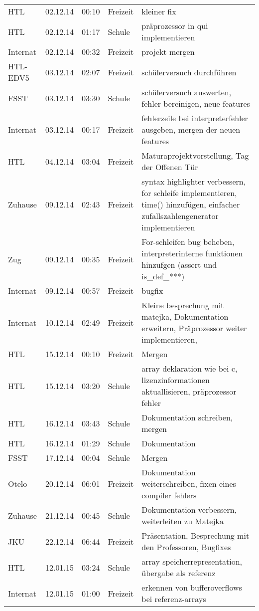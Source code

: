\begin{small}
\begin{longtable}{ p{} p{} p{} p{} p{}}
HTL	& 02.12.14	& 00:10	& Freizeit	& kleiner fix \\
HTL	& 02.12.14	& 01:17	& Schule	& pr\"aprozessor in qui implementieren \\
Internat	& 02.12.14	& 00:32	& Freizeit	& projekt mergen \\
HTL-EDV5	& 03.12.14	& 02:07	& Freizeit	& sch\"ulerversuch durchf\"uhren \\
FSST	& 03.12.14	& 03:30	& Schule	& sch\"ulerversuch auswerten, fehler bereinigen, neue features \\
Internat	& 03.12.14	& 00:17	& Freizeit	& fehlerzeile bei interpreterfehler ausgeben, mergen der neuen features \\
HTL	& 04.12.14	& 03:04	& Freizeit	& Maturaprojektvorstellung, Tag der Offenen T\"ur \\
Zuhause	& 09.12.14	& 02:43	& Freizeit	& syntax highlighter verbessern, for schleife implementieren, time() hinzuf\"ugen, einfacher zufallszahlengenerator implementieren \\
Zug	& 09.12.14	& 00:35	& Freizeit	& For-schleifen bug beheben, interpreterinterne funktionen hinzufgen (assert und is\_def\_***) \\
Internat	& 09.12.14	& 00:57	& Freizeit	& bugfix \\
Internat	& 10.12.14	& 02:49	& Freizeit	& Kleine besprechung mit matejka, Dokumentation erweitern, Pr\"aprozessor weiter implementieren,  \\
HTL	& 15.12.14	& 00:10	& Freizeit	& Mergen \\
HTL	& 15.12.14	& 03:20	& Schule	& array deklaration wie bei c, lizenzinformationen aktuallisieren, pr\"aprozessor fehler \\
HTL	& 16.12.14	& 03:43	& Schule	& Dokumentation schreiben, mergen \\
HTL	& 16.12.14	& 01:29	& Schule	& Dokumentation \\
FSST	& 17.12.14	& 00:04	& Schule	& Mergen \\
Otelo	& 20.12.14	& 06:01	& Freizeit	& Dokumentation weiterschreiben, fixen eines compiler fehlers \\
Zuhause	& 21.12.14	& 00:45	& Schule	& Dokumentation verbessern, weiterleiten zu Matejka \\
JKU	& 22.12.14	& 06:44	& Freizeit	& Pr\"asentation, Besprechung mit den Professoren, Bugfixes \\
HTL	& 12.01.15	& 03:24	& Schule	& array speicherrepresentation, \"ubergabe als referenz \\
Internat	& 12.01.15	& 01:00	& Freizeit	& erkennen von bufferoverflows bei referenz-arrays \\

\end{longtable}
\end{small}
